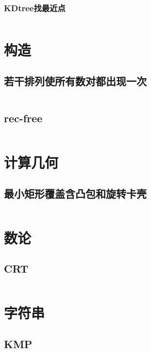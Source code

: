 \documentclass{article}
\begin{document}
\subsubsection{KDtree找最近点}
\inputminted[breaklines]{c++}{../数据结构/KDtree找最近点.cpp}

\newpage
\section{构造}
\subsection{若干排列使所有数对都出现一次}
\inputminted[breaklines]{c++}{../构造/若干排列使所有数对都出现一次.cpp}

\subsection{rec-free}
\inputminted[breaklines]{c++}{../构造/rec-free.cpp}

\newpage
\section{计算几何}
\subsection{最小矩形覆盖含凸包和旋转卡壳}
\inputminted[breaklines]{c++}{../计算几何/最小矩形覆盖含凸包和旋转卡壳.cpp}

\newpage
\section{数论}
\subsection{CRT}
\inputminted[breaklines]{c++}{../数论/CRT.cpp}

\newpage
\section{字符串}
\subsection{KMP}
\inputminted[breaklines]{c++}{../字符串/KMP.cpp}

\newpage
\end{document}
